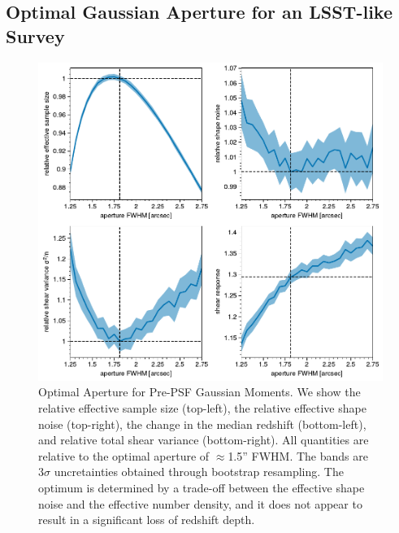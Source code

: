 \documentclass[twocolappendix, appendixfloats, numberedappendix, twocolumn, apj]{openjournal}
\begin{document}
\subsection{Optimal Gaussian Aperture for an LSST-like Survey}

\begin{figure}
  \centering
  \vspace{1em}
  \includegraphics[width=\columnwidth]{figures/optap.pdf}
  \caption{
    Optimal Aperture for Pre-PSF Gaussian Moments. We show the relative effective sample
    size (top-left), the relative effective shape noise (top-right), the change in the median
    redshift (bottom-left), and relative total shear variance (bottom-right). All quantities are
    relative to the optimal aperture of $\approx$1.5'' FWHM. The bands are $3\sigma$ uncretainties
    obtained through bootstrap resampling. The optimum is determined by a trade-off
    between the effective shape noise and the effective number density, and it does not appear to
    result in a significant loss of redshift depth.
    \label{fig:opap}
  }
\end{figure}
\end{document}
